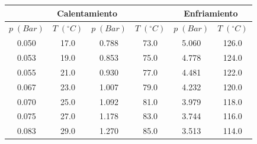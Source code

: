 \documentclass[a4paper,12pt,titlepage]{article}
\begin{document}
\begin{table}[h!]
\centering
\begin{tabular}{|cccccc}
\hline
\multicolumn{4}{|c|}{Calentamiento}                                                                                                                      & \multicolumn{2}{c|}{Enfriamiento}                                          \\ \hline
\multicolumn{1}{|c|}{$p \;(Bar)$} & \multicolumn{1}{c|}{$T \; (^{\circ}C)$} & \multicolumn{1}{c|}{$p \;(Bar)$} & \multicolumn{1}{c|}{$T \; (^{\circ}C)$} & \multicolumn{1}{c|}{$p \;(Bar)$} & \multicolumn{1}{c|}{$T \; (^{\circ}C)$} \\ \hline
\multicolumn{1}{|c|}{0.050}        & \multicolumn{1}{c|}{17.0}               & \multicolumn{1}{c|}{0.788}       & \multicolumn{1}{c|}{73.0}               & \multicolumn{1}{c|}{5.060}        & \multicolumn{1}{c|}{126.0}              \\ \hline
\multicolumn{1}{|c|}{0.053}       & \multicolumn{1}{c|}{19.0}               & \multicolumn{1}{c|}{0.853}       & \multicolumn{1}{c|}{75.0}               & \multicolumn{1}{c|}{4.778}       & \multicolumn{1}{c|}{124.0}              \\ \hline
\multicolumn{1}{|c|}{0.055}       & \multicolumn{1}{c|}{21.0}               & \multicolumn{1}{c|}{0.930}        & \multicolumn{1}{c|}{77.0}               & \multicolumn{1}{c|}{4.481}       & \multicolumn{1}{c|}{122.0}              \\ \hline
\multicolumn{1}{|c|}{0.067}       & \multicolumn{1}{c|}{23.0}               & \multicolumn{1}{c|}{1.007}       & \multicolumn{1}{c|}{79.0}               & \multicolumn{1}{c|}{4.232}       & \multicolumn{1}{c|}{120.0}              \\ \hline
\multicolumn{1}{|c|}{0.070}        & \multicolumn{1}{c|}{25.0}               & \multicolumn{1}{c|}{1.092}       & \multicolumn{1}{c|}{81.0}               & \multicolumn{1}{c|}{3.979}       & \multicolumn{1}{c|}{118.0}              \\ \hline
\multicolumn{1}{|c|}{0.075}       & \multicolumn{1}{c|}{27.0}               & \multicolumn{1}{c|}{1.178}       & \multicolumn{1}{c|}{83.0}               & \multicolumn{1}{c|}{3.744}       & \multicolumn{1}{c|}{116.0}              \\ \hline
\multicolumn{1}{|c|}{0.083}       & \multicolumn{1}{c|}{29.0}               & \multicolumn{1}{c|}{1.270}        & \multicolumn{1}{c|}{85.0}               & \multicolumn{1}{c|}{3.513}       & \multicolumn{1}{c|}{114.0}              \\ \hline

\end{tabular}
\end{table}
\end{document}
